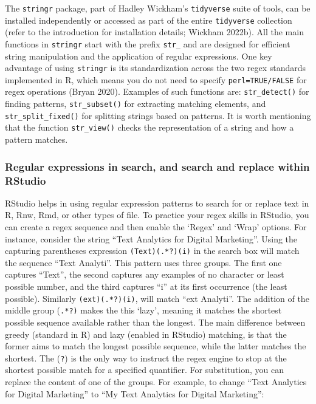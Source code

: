 The \texttt{stringr} package, part of Hadley Wickham's
\texttt{tidyverse} suite of tools, can be installed independently or
accessed as part of the entire \texttt{tidyverse} collection (refer to
the introduction for installation details; Wickham 2022b). All the main
functions in \texttt{stringr} start with the prefix \texttt{str\_} and
are designed for efficient string manipulation and the application of regular expressions. One key advantage of using \texttt{stringr} is its
standardization across the two regex standards implemented in R, which
means you do not need to specify \texttt{perl=TRUE/FALSE} for regex
operations (Bryan 2020). Examples of such functions are:
\texttt{str\_detect()} for finding patterns, \texttt{str\_subset()} for
extracting matching elements, and \texttt{str\_split\_fixed()} for
splitting strings based on patterns. It is worth mentioning that the
function \texttt{str\_view()} checks the representation of a string and
how a pattern matches.

\subsubsection{Regular expressions in search, and search and replace within
RStudio}\label{regular-expressions-in-search-search-and-replace-within-rstudio}

RStudio helps in using regular expression patterns to
search for or replace text in R, Rnw, Rmd, or other types of file. To
practice your regex skills in RStudio, you can create a regex sequence
and then enable the `Regex' and `Wrap' options. For instance, consider
the string ``Text Analytics for Digital Marketing''. Using the capturing
parentheses expression \texttt{(Text)(.*?)(i)} in the search box will
match the sequence ``Text Analyti''. This pattern uses three groups. The
first one captures ``Text'', the second captures any examples of no character or
least possible number, and the third captures ``i'' at its
first occurrence (the least possible). Similarly
\texttt{(ext)(.*?)(i)}, will match ``ext Analyti''. The addition of the
middle group (\texttt{.*?)} makes the this `lazy', meaning it
matches the shortest possible sequence available rather than the longest. The main
difference between greedy (standard in R) and lazy (enabled in RStudio)
matching, is that the former aims to match the longest possible sequence,
while the latter matches the shortest. The (\texttt{?}) is the only way to instruct the regex engine to stop at the shortest possible
match for a specified quantifier. For substitution, you can replace the
content of one of the groups. For example, to change ``Text Analytics
for Digital Marketing'' to ``My Text Analytics for Digital Marketing'':

